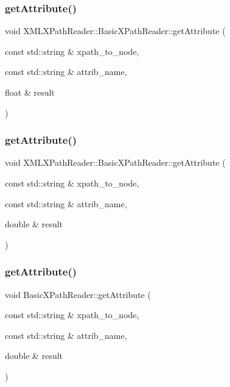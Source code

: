 \subsubsection{\texorpdfstring{getAttribute()}{getAttribute()}\hspace{0.1cm}{\footnotesize\ttfamily [24/30]}}
{\footnotesize\ttfamily void X\+M\+L\+X\+Path\+Reader\+::\+Basic\+X\+Path\+Reader\+::get\+Attribute (\begin{DoxyParamCaption}\item[{const std\+::string \&}]{xpath\+\_\+to\+\_\+node,  }\item[{const std\+::string \&}]{attrib\+\_\+name,  }\item[{float \&}]{result }\end{DoxyParamCaption})}

\mbox{\label{classXMLXPathReader_1_1BasicXPathReader_a4278ca0d297a82127b737339de448424}} 
\subsubsection{\texorpdfstring{getAttribute()}{getAttribute()}\hspace{0.1cm}{\footnotesize\ttfamily [25/30]}}
{\footnotesize\ttfamily void X\+M\+L\+X\+Path\+Reader\+::\+Basic\+X\+Path\+Reader\+::get\+Attribute (\begin{DoxyParamCaption}\item[{const std\+::string \&}]{xpath\+\_\+to\+\_\+node,  }\item[{const std\+::string \&}]{attrib\+\_\+name,  }\item[{double \&}]{result }\end{DoxyParamCaption})}

\mbox{\label{classXMLXPathReader_1_1BasicXPathReader_a0cee8b6f9d3b93f7d6b37e00496a2667}} 
\subsubsection{\texorpdfstring{getAttribute()}{getAttribute()}\hspace{0.1cm}{\footnotesize\ttfamily [26/30]}}
{\footnotesize\ttfamily void Basic\+X\+Path\+Reader\+::get\+Attribute (\begin{DoxyParamCaption}\item[{const std\+::string \&}]{xpath\+\_\+to\+\_\+node,  }\item[{const std\+::string \&}]{attrib\+\_\+name,  }\item[{double \&}]{result }\end{DoxyParamCaption})}

